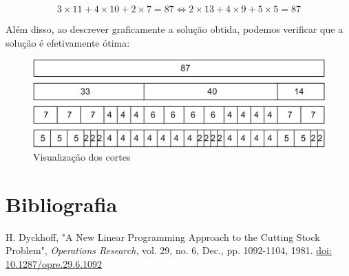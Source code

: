 \documentclass[12pt, a4paper, titlepage]{article}
\begin{document}
$$3 \times 11 + 4 \times 10 + 2 \times 7 = 87 \Leftrightarrow 2 \times 13 + 4 \times 9 + 5 \times 5 = 87$$

Além disso, ao descrever graficamente a solução obtida, podemos verificar que a solução é
efetivamente ótima:

\begin{figure}[H]
    \centering
    \includegraphics[width=0.75\linewidth]{images/cortes.png}
    \caption{Visualização dos cortes}
    \label{fig:cuts}
\end{figure}

\section{Bibliografia}
\def\refname{}
\vspace{-1.5cm}
\begin{thebibliography}{9}
    H. Dyckhoff, "A New Linear Programming Approach to the Cutting Stock Problem",
    \emph{Operations Research}, vol. 29, no. 6, Dec., pp. 1092-1104, 1981.
    \href{https://doi.org/10.1287/opre.29.6.1092}{doi: 10.1287/opre.29.6.1092}
\end{thebibliography}
\end{document}
